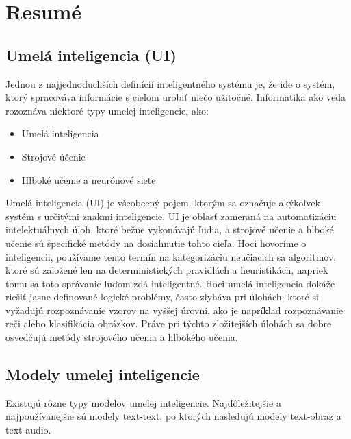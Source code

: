 \chapter{Resumé}


\section*{Umelá inteligencia (UI) \label{sec:AI_resume}}

Jednou z najjednoduchších definícií inteligentného systému je, že ide o systém, ktorý spracováva informácie s cieľom urobiť niečo užitočné. Informatika ako veda rozoznáva niektoré typy umelej inteligencie, ako:

\begin{itemize}
    \item Umelá inteligencia
    \item Strojové účenie
    \item Hlboké učenie a neurónové siete
\end{itemize}

Umelá inteligencia (UI) je všeobecný pojem, ktorým sa označuje akýkoľvek systém s určitými znakmi inteligencie. UI je oblasť zameraná na automatizáciu intelektuálnych úloh, ktoré bežne vykonávajú ľudia, a strojové učenie a hlboké učenie sú špecifické metódy na dosiahnutie tohto cieľa. Hoci hovoríme o inteligencii, používame tento termín na kategorizáciu neučiacich sa algoritmov, ktoré sú založené len na deterministických pravidlách a heuristikách, napriek tomu sa toto správanie ľuďom zdá inteligentné. Hoci umelá inteligencia dokáže riešiť jasne definované logické problémy, často zlyháva pri úlohách, ktoré si vyžadujú rozpoznávanie vzorov na vyššej úrovni, ako je napríklad rozpoznávanie reči alebo klasifikácia obrázkov. Práve pri týchto zložitejších úlohách sa dobre osvedčujú metódy strojového učenia a hlbokého učenia.

\section*{Modely umelej inteligencie \label{sec:AI_models_resume}}

Existujú rôzne typy modelov umelej inteligencie. Najdôležitejšie a najpoužívanejšie sú modely text-text, po ktorých nasledujú modely text-obraz a text-audio. 

